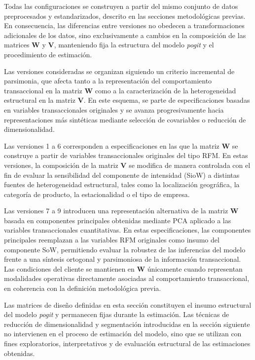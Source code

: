     Todas las configuraciones se construyen a partir del mismo conjunto de datos preprocesados y estandarizados, descrito en las secciones metodológicas previas. En consecuencia, las diferencias entre versiones no obedecen a transformaciones adicionales de los datos, sino exclusivamente a cambios en la composición de las matrices $\mathbf{W}$ y $\mathbf{V}$, manteniendo fija la estructura del modelo \emph{pogit} y el procedimiento de estimación.
    
    Las versiones consideradas se organizan siguiendo un criterio incremental de parsimonia, que afecta tanto a la representación del comportamiento transaccional en la matriz $\mathbf{W}$ como a la caracterización de la heterogeneidad estructural en la matriz $\mathbf{V}$. En este esquema, se parte de especificaciones basadas en variables transaccionales originales y se avanza progresivamente hacia representaciones más sintéticas mediante selección de covariables o reducción de dimensionalidad.
    
    Las versiones 1 a 6 corresponden a especificaciones en las que la matriz $\mathbf{W}$ se construye a partir de variables transaccionales originales del tipo RFM. En estas versiones, la composición de la matriz $\mathbf{V}$ se modifica de manera controlada con el fin de evaluar la sensibilidad del componente de intensidad (SioW) a distintas fuentes de heterogeneidad estructural, tales como la localización geográfica, la categoría de producto, la estacionalidad o el tipo de empresa.
    
    Las versiones 7 a 9 introducen una representación alternativa de la matriz $\mathbf{W}$ basada en componentes principales obtenidas mediante PCA aplicado a las variables transaccionales cuantitativas. En estas especificaciones, las componentes principales reemplazan a las variables RFM originales como insumo del componente SoW, permitiendo evaluar la robustez de las inferencias del modelo frente a una síntesis ortogonal y parsimoniosa de la información transaccional. Las condiciones del cliente se mantienen en $\mathbf{W}$ únicamente cuando representan modalidades operativas directamente asociadas al comportamiento transaccional, en coherencia con la definición metodológica previa.
    
    Las matrices de diseño definidas en esta sección constituyen el insumo estructural del modelo \emph{pogit} y permanecen fijas durante la estimación. Las técnicas de reducción de dimensionalidad y segmentación introducidas en la sección siguiente no intervienen en el proceso de estimación del modelo, sino que se utilizan con fines exploratorios, interpretativos y de evaluación estructural de las estimaciones obtenidas.
    
